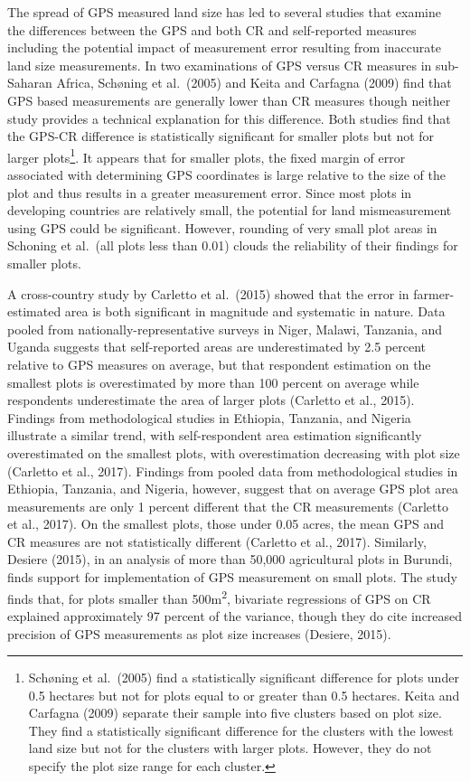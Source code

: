 \documentclass[
]{book}
\begin{document}
The spread of GPS measured land size has led to several studies that examine the differences between the GPS and both CR and self-reported measures including the potential impact of measurement error resulting from inaccurate land size measurements. In two examinations of GPS versus CR measures in sub-Saharan Africa, Schøning et al.~(2005) and Keita and Carfagna (2009) find that GPS based measurements are generally lower than CR measures though neither study provides a technical explanation for this difference. Both studies find that the GPS-CR difference is statistically significant for smaller plots but not for larger plots\footnote{Schøning et al.~(2005) find a statistically significant difference for plots under 0.5 hectares but not for plots equal to or greater than 0.5 hectares. Keita and Carfagna (2009) separate their sample into five clusters based on plot size. They find a statistically significant difference for the clusters with the lowest land size but not for the clusters with larger plots. However, they do not specify the plot size range for each cluster.}. It appears that for smaller plots, the fixed margin of error associated with determining GPS coordinates is large relative to the size of the plot and thus results in a greater measurement error. Since most plots in developing countries are relatively small, the potential for land mismeasurement using GPS could be significant. However, rounding of very small plot areas in Schoning et al.~(all plots less than 0.01) clouds the reliability of their findings for smaller plots.

A cross-country study by Carletto et al.~(2015) showed that the error in farmer-estimated area is both significant in magnitude and systematic in nature. Data pooled from nationally-representative surveys in Niger, Malawi, Tanzania, and Uganda suggests that self-reported areas are underestimated by 2.5 percent relative to GPS measures on average, but that respondent estimation on the smallest plots is overestimated by more than 100 percent on average while respondents underestimate the area of larger plots (Carletto et al., 2015). Findings from methodological studies in Ethiopia, Tanzania, and Nigeria illustrate a similar trend, with self-respondent area estimation significantly overestimated on the smallest plots, with overestimation decreasing with plot size (Carletto et al., 2017). Findings from pooled data from methodological studies in Ethiopia, Tanzania, and Nigeria, however, suggest that on average GPS plot area measurements are only 1 percent different that the CR measurements (Carletto et al., 2017). On the smallest plots, those under 0.05 acres, the mean GPS and CR measures are not statistically different (Carletto et al., 2017). Similarly, Desiere (2015), in an analysis of more than 50,000 agricultural plots in Burundi, finds support for implementation of GPS measurement on small plots. The study finds that, for plots smaller than 500m\textsuperscript{2}, bivariate regressions of GPS on CR explained approximately 97 percent of the variance, though they do cite increased precision of GPS measurements as plot size increases (Desiere, 2015).
\end{document}

